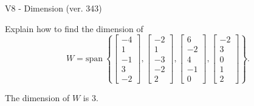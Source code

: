 \begin{exercise}
  \begin{exerciseTitle}V8 - Dimension (ver. 343)\end{exerciseTitle}
  \begin{exerciseStatement}
    Explain how to find the dimension of 
\[W=\mathrm{span}\ \left\{\left[\begin{array}{r}
-4 \\
1 \\
-1 \\
3 \\
-2
\end{array}\right] , \left[\begin{array}{r}
-2 \\
1 \\
-3 \\
-2 \\
2
\end{array}\right] , \left[\begin{array}{r}
6 \\
-2 \\
4 \\
-1 \\
0
\end{array}\right] , \left[\begin{array}{r}
-2 \\
3 \\
0 \\
1 \\
2
\end{array}\right]\right\}.\]



  \end{exerciseStatement}
  \begin{exerciseAnswer}
   The dimension of \(W\) is  \(3\).
  


  \end{exerciseAnswer}
\end{exercise}